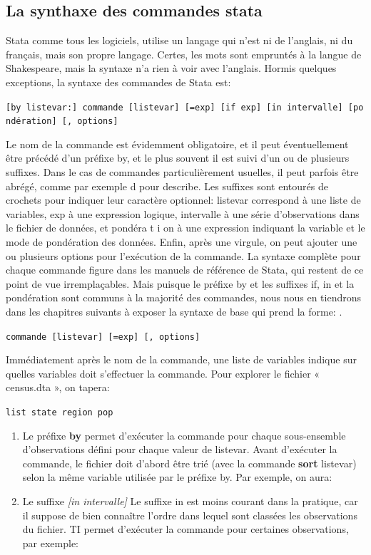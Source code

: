 \documentclass[
]{book}
\begin{document}
\hypertarget{la-synthaxe-des-commandes-stata}{%
\subsection{La synthaxe des commandes stata}\label{la-synthaxe-des-commandes-stata}}

Stata comme tous les logiciels, utilise un langage qui n'est ni de
l'anglais, ni du français, mais son propre langage. Certes, les
mots sont empruntés à la langue de Shakespeare, mais la syntaxe
n'a rien à voir avec l'anglais. Hormis quelques exceptions, la
syntaxe des commandes de Stata est:

\texttt{{[}by\ listevar:{]}\ commande\ {[}listevar{]}\ {[}=exp{]}\ {[}if\ exp{]}\ {[}in\ intervalle{]}\ {[}pondération{]}\ {[},\ options{]}}

Le nom de la commande est évidemment obligatoire, et il peut
éventuellement être précédé d'un préfixe by, et le plus souvent il
est suivi d'un ou de plusieurs suffixes. Dans le cas de
commandes particulièrement usuelles, il peut parfois être abrégé,
comme par exemple d pour describe. Les suffixes sont entourés de crochets pour indiquer leur caractère optionnel:
listevar correspond à une liste de variables, exp à une
expression logique, intervalle à une série d'observations
dans le fichier de données, et pondéra t i on à une expression
indiquant la variable et le mode de pondération des données.
Enfin, après une virgule, on peut ajouter une ou plusieurs
options pour l'exécution de la commande.
La syntaxe complète pour chaque commande figure dans les
manuels de référence de Stata, qui restent de ce point de vue
irremplaçables. Mais puisque le préfixe by et les suffixes if, in
et la pondération sont communs à la majorité des commandes,
nous nous en tiendrons dans les chapitres suivants à exposer la
syntaxe de base qui prend la forme: .

\texttt{commande\ {[}listevar{]}\ {[}=exp{]}\ {[},\ options{]}}

Immédiatement après le nom de la commande, une liste de
variables indique sur quelles variables doit s'effectuer la commande. Pour explorer le fichier « census.dta », on tapera:

\texttt{list\ state\ region\ pop}

\begin{enumerate}
\def\labelenumi{(\alph{enumi})}
\item
  Le préfixe \textbf{by}
  permet d'exécuter la commande pour chaque
  sous-ensemble d'observations défini pour chaque valeur de
  listevar. Avant d'exécuter la commande, le fichier doit
  d'abord être trié (avec la commande \textbf{sort} listevar) selon la
  même variable utilisée par le préfixe by. Par exemple, on aura:
\item
  Le suffixe \emph{{[}in intervalle{]}}
  Le suffixe in est moins courant dans la pratique, car il suppose
  de bien connaître l'ordre dans lequel sont classées les
  observations du fichier. TI permet d'exécuter la commande pour
  certaines observations, par exemple:
\end{enumerate}
\end{document}
